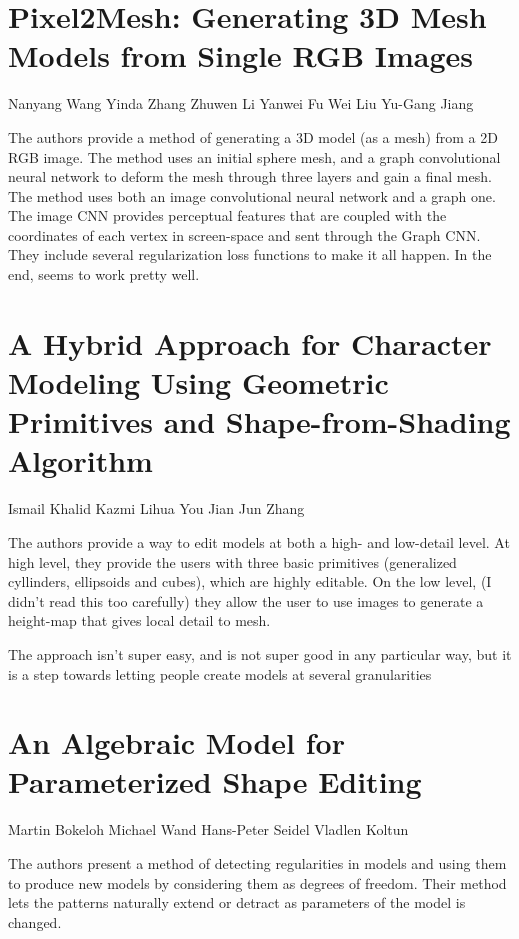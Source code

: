 \section*{Pixel2Mesh: Generating 3D Mesh Models from Single RGB Images}

Nanyang Wang
Yinda Zhang
Zhuwen Li
Yanwei Fu
Wei Liu
Yu-Gang Jiang

The authors provide a method of generating a 3D model (as a mesh) from a 2D RGB image. The method uses an initial sphere mesh, and a graph convolutional neural network to deform the mesh through three layers and gain a final mesh. The method uses both an image convolutional neural network and a graph one. The image CNN provides perceptual features that are coupled with the coordinates of each vertex in screen-space and sent through the Graph CNN. They include several regularization loss functions to make it all happen. In the end, seems to work pretty well.


\section*{A Hybrid Approach for Character Modeling Using Geometric Primitives and Shape-from-Shading Algorithm}

Ismail Khalid Kazmi
Lihua You
Jian Jun Zhang

The authors provide a way to edit models at both a high- and low-detail level. At high level, they provide the users with three basic primitives (generalized cyllinders, ellipsoids and cubes), which are highly editable. On the low level, (I didn't read this too carefully) they allow the user to use images to generate a height-map that gives local detail to mesh.

The approach isn't super easy, and is not super good in any particular way, but it is a step towards letting people create models at several granularities


\section*{An Algebraic Model for Parameterized Shape Editing}

Martin Bokeloh
Michael Wand
Hans-Peter Seidel
Vladlen Koltun

The authors present a method of detecting regularities in models and using them to produce new models by considering them as degrees of freedom. Their method lets the patterns naturally extend or detract as parameters of the model is changed. 

